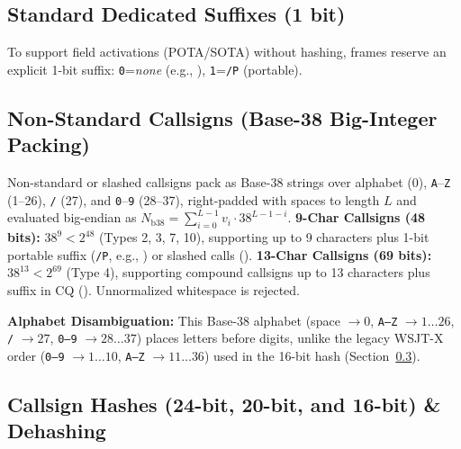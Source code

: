 {%
\subsection{Standard Dedicated Suffixes (1 bit)}
\label{sec:std_portable_suffix}

To support field activations (POTA/SOTA) without hashing, frames reserve an explicit 1-bit suffix: \texttt{0}=\emph{none} (e.g., ), \texttt{1}=\texttt{/P} (portable).

\subsection{Non-Standard Callsigns (Base-38 Big-Integer Packing)}
\label{sec:nonstd_call}

Non-standard or slashed callsigns pack as Base-38 strings over alphabet \textvisiblespace{} (0), \texttt{A}--\texttt{Z} (1--26), \texttt{/} (27), and \texttt{0}--\texttt{9} (28--37), right-padded with spaces to length $L$ and evaluated big-endian as $N_{\text{b38}} = \sum_{i=0}^{L-1} v_i \cdot 38^{L-1-i}$. \textbf{9-Char Callsigns (48 bits):} $38^9 < 2^{48}$ (Types 2, 3, 7, 10), supporting up to 9 characters plus 1-bit portable suffix (\texttt{/P}, e.g., ) or slashed calls (). \textbf{13-Char Callsigns (69 bits):} $38^{13} < 2^{69}$ (Type 4), supporting compound callsigns up to 13 characters plus suffix in CQ (). Unnormalized whitespace is rejected.

\textbf{Alphabet Disambiguation:} This Base-38 alphabet (space $\to 0$, \texttt{A--Z} $\to 1\dots 26$, \texttt{/} $\to 27$, \texttt{0--9} $\to 28\dots 37$) places letters before digits, unlike the legacy WSJT-X order (\texttt{0--9} $\to 1\dots 10$, \texttt{A--Z} $\to 11\dots 36$) used in the 16-bit hash (Section~\ref{sec:hash}).

\subsection{Callsign Hashes (24-bit, 20-bit, and 16-bit) \& Dehashing}
\label{sec:hash}

}
